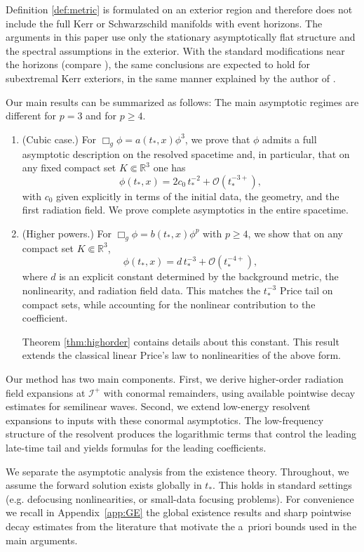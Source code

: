 \documentclass[10pt,a4paper,reqno]{amsart}
\newcommand{\RR}{\mathbb{R}}
\theoremstyle{definition}
\theoremstyle{remark}
\numberwithin{equation}{section}
\begin{document}
Definition \ref{def:metric} is formulated on an exterior region and therefore does not include the full Kerr or Schwarzschild manifolds with event horizons. The arguments in this paper use only the stationary asymptotically flat structure and the spectral assumptions in the exterior. With the standard modifications near the horizons (compare \cite[Section 4]{Hin22}), the same conclusions are expected to hold for subextremal Kerr exteriors, in the same manner explained by the author of \cite{Hin22}.


Our main results can be summarized as follows: The main asymptotic regimes are different for $p=3$ and for $p\ge 4$.

\begin{enumerate}
\item (Cubic case.) For $\Box_g\phi=a(t_*,x)\phi^3$, we prove that $\phi$ admits a full asymptotic description on the resolved spacetime and, in particular, that on any fixed compact set $K\Subset\RR^3$ one has
\[
\phi(t_*,x)=2c_0\,t_*^{-2}+\mathcal{O}(t_*^{-3+}),
\]
with $c_0$ given explicitly in terms of the initial data, the geometry, and the first radiation field. We prove complete asymptotics in the entire spacetime. 

\item (Higher powers.) For $\Box_g\phi=b(t_*,x)\phi^p$ with $p\ge4$, we show that on any compact set $K\Subset\RR^3$,
\[
\phi(t_*,x)=d\,t_*^{-3}+\mathcal{O}(t_*^{-4+}),
\]
where $d$ is an explicit constant determined by the background metric, the nonlinearity, and radiation field data. This matches the $t_*^{-3}$ Price tail on compact sets, while accounting for the nonlinear contribution to the coefficient.

Theorem \ref{thm:highorder} contains details about this constant. This result extends the classical linear Price's law to nonlinearities of the above form.
\end{enumerate}

Our method has two main components. First, we derive higher-order radiation field expansions at $\mathscr I^+$ with conormal remainders, using available pointwise decay estimates for semilinear waves. Second, we extend low-energy resolvent expansions to inputs with these conormal asymptotics. The low-frequency structure of the resolvent produces the logarithmic terms that control the leading late-time tail and yields formulas for the leading coefficients.



We separate the asymptotic analysis from the existence theory. Throughout, we assume the forward solution exists globally in $t_*$. This holds in standard settings (e.g. defocusing nonlinearities, or small-data focusing problems). For convenience we recall in Appendix~\ref{app:GE} the global existence results and sharp pointwise decay estimates from the literature that motivate the a~priori bounds used in the main arguments.
\end{document}

